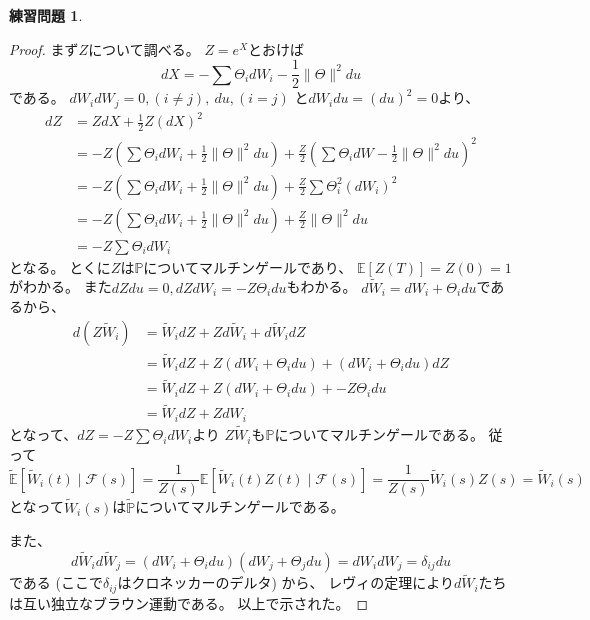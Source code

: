 \documentclass[uplatex]{jsarticle}
\theoremstyle{definition}
\newtheorem{prob}[prob]{練習問題}
\def\P{\mathbb{P}}
\def\E{\mathbb{E}}
\def\mcF{\mathcal{F}}
\begin{document}
\begin{prob}\label{prob: 5.6}

\end{prob}

\begin{proof}
  まず\(Z\)について調べる。
  \(Z=e^X\)とおけば
  \[
  dX = -\sum \Theta_i dW_i - \frac{1}{2}\| \Theta \|^2 du
  \]
  である。
  \(dW_idW_j = 0 , (i\neq j), \ du , (i=j)\)
  と\(dW_idu = (du)^2 = 0\)より、
  \begin{align*}
    dZ &= ZdX + \frac{1}{2}Z(dX)^2 \\
    &= -Z\left( \sum \Theta_i dW_i + \frac{1}{2}\| \Theta \|^2 du \right)
    + \frac{Z}{2}\left( \sum \Theta_i dW
    - \frac{1}{2}\| \Theta \|^2 du \right) ^2 \\
    &= -Z\left( \sum \Theta_i dW_i + \frac{1}{2}\| \Theta \|^2 du \right)
    + \frac{Z}{2} \sum \Theta_i^2 (dW_i)^2 \\
    &= -Z\left( \sum \Theta_i dW_i + \frac{1}{2}\| \Theta \|^2 du \right)
    + \frac{Z}{2} \| \Theta \|^2 du \\
    &= -Z \sum \Theta_i dW_i
  \end{align*}
  となる。
  とくに\(Z\)は\(\P\)についてマルチンゲールであり、
  \(\E[Z(T)] = Z(0) = 1\)がわかる。
  また\(dZdu = 0, dZdW_i = -Z \Theta_i du\)もわかる。
  \(d\tilde{W}_i = dW_i + \Theta_i du\)であるから、
  \begin{align*}
    d(Z\tilde{W}_i) &= \tilde{W}_idZ + Zd\tilde{W}_i + d\tilde{W}_idZ \\
    &= \tilde{W}_idZ + Z(dW_i + \Theta_i du) + (dW_i + \Theta_i du)dZ \\
    &= \tilde{W}_idZ + Z(dW_i + \Theta_i du) + -Z \Theta_i du \\
    &= \tilde{W}_idZ + ZdW_i
  \end{align*}
  となって、\(dZ = -Z \sum \Theta_i dW_i\)より
  \(Z\tilde{W}_i\)も\(\P\)についてマルチンゲールである。
  従って
  \[
  \tilde{\E} [\tilde{W}_i(t) \mid \mcF(s)]
  = \frac{1}{Z(s)}\E [\tilde{W}_i(t)Z(t) \mid \mcF(s)]
  = \frac{1}{Z(s)}\tilde{W}_i(s)Z(s) = \tilde{W}_i(s)
  \]
  となって\(\tilde{W}_i(s)\)は\(\tilde{\P}\)についてマルチンゲールである。

  また、
  \[
  d\tilde{W}_id\tilde{W}_j
  = (dW_i + \Theta_i du) (dW_j + \Theta_j du)
  = dW_idW_j = \delta_{ij}du
  \]
  である (ここで\(\delta_{ij}\)はクロネッカーのデルタ) から、
  レヴィの定理により\(d\tilde{W}_i\)たちは互い独立なブラウン運動である。
  以上で示された。
\end{proof}
\end{document}
